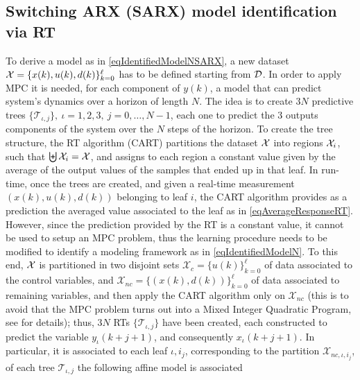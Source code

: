 
\subsection{Switching ARX (SARX) model identification via RT} To derive a model as in \eqref{eqIdentifiedModelNSARX}, a new dataset $\mathcal{X}= \{x(k),u(k),d(k)\}_{k = 0}^{\ell}$ has to be defined starting from $\mathcal{D}$. In order to apply MPC it is needed, for each component of $y(k)$, a model that can predict system's dynamics over a horizon of length $N$. The idea is to create $3 N$ predictive trees $\{\mathcal{T}_{\iota,j}\},\ \iota=1,2,3,\ j=0,\ldots,N-1$, each one to predict the 3 outputs components of the system over the $N$ steps of the horizon. To create the tree structure, the RT algorithm (CART) partitions the dataset $\mathcal{X}$ into regions $\mathcal{X}_i$, such that $\biguplus \mathcal{X}_i = \mathcal{X}$, and assigns to each region a constant value given by the average of the output values of the samples that ended up in that leaf. In run-time, once the trees are created, and given a real-time measurement $(x(k), u(k), d(k))$ belonging to leaf $i$, the CART algorithm provides as a prediction the averaged value associated to the leaf as in \eqref{eqAverageResponseRT}. However, since the prediction provided by the RT is a constant value, it cannot be used to setup an MPC problem, thus the learning procedure needs to be modified to identify a modeling framework as in \eqref{eqIdentifiedModelN}. To this end, $\mathcal{X}$ is partitioned in two disjoint sets $\mathcal{X}_c = \{u(k)\}_{k=0}^{\ell}$ of data associated to the control variables, and $\mathcal{X}_{nc} = \{(x(k), d(k))\}_{k=0}^{\ell}$ of data associated to remaining variables, and then apply the CART algorithm only on $\mathcal{X}_{nc}$ (this is to avoid that the MPC problem turns out into a Mixed Integer Quadratic Program, see \cite{SmarraADHS2018,smarraNAHS2020} for details); thus, $3 N$ RTs $\{\mathcal{T}_{\iota,j}\}$ have been created, each constructed to predict the variable $y_\iota(k+j+1)$, and consequently $x_\iota(k+j+1)$. In particular, it is associated to each leaf $\iota,i_j$, corresponding to the partition  $\mathcal{X}_{nc,\iota,i_j}$, of each tree $\mathcal{T}_{\iota,j}$ the following affine model is associated

\small

